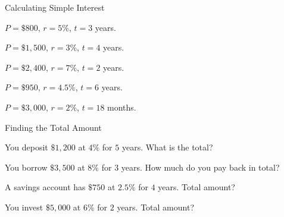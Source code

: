 \begin{practiceBox}{Calculating Simple Interest}


\prob $P = \$800$, $r = 5\%$, $t = 3$ years. \answerBlank[3cm]

\prob $P = \$1{,}500$, $r = 3\%$, $t = 4$ years. \answerBlank[3cm]

\prob $P = \$2{,}400$, $r = 7\%$, $t = 2$ years. \answerBlank[3cm]

\prob $P = \$950$, $r = 4.5\%$, $t = 6$ years. \answerBlank[3cm]

\prob $P = \$3{,}000$, $r = 2\%$, $t = 18$ months. \answerBlank[3cm]

\end{practiceBox}

\begin{practiceBox}[funTeal]{Finding the Total Amount}


\prob You deposit $\$1{,}200$ at $4\%$ for $5$ years. What is the total? \answerBlank[3cm]

\prob You borrow $\$3{,}500$ at $8\%$ for $3$ years. How much do you pay back in total? \answerBlank[3cm]

\prob A savings account has $\$750$ at $2.5\%$ for $4$ years. Total amount? \answerBlank[3cm]

\prob You invest $\$5{,}000$ at $6\%$ for $2$ years. Total amount? \answerBlank[3cm]

\end{practiceBox}

